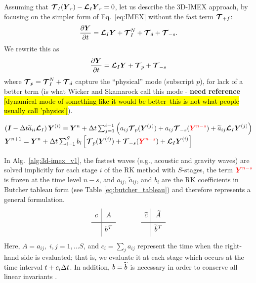 \documentclass{report}
\begin{document}
Assuming that $\boldsymbol{{\mathcal{T}}}_I(\boldsymbol{{Y}}_r) - \boldsymbol{{\mathcal{L}}}_I \boldsymbol{{Y}}_r=0$, let us
describe the 3D-IMEX approach, by focusing on the simpler form of Eq.\ \eqref{eq:IMEX} without the fast term $\boldsymbol{{\mathcal{T}}}_{+f}$: 
\begin{equation}
\label{eq:IMEX_v2}
\frac{\partial\boldsymbol{{Y}}}{\partial t} =  \boldsymbol{{\mathcal{L}}}_I \boldsymbol{{Y}} + \boldsymbol{{\mathcal{T}}}^N_{I} + \boldsymbol{{\mathcal{T}}}_{d} + \boldsymbol{{\mathcal{T}}}_{-s}.
\end{equation}
We rewrite this as
\begin{equation}
\label{eq:IMEX_v3}
\frac{\partial\boldsymbol{{Y}}}{\partial t} =  \boldsymbol{{\mathcal{L}}}_I \boldsymbol{{Y}} + \boldsymbol{{\mathcal{T}}}_{p} + \boldsymbol{{\mathcal{T}}}_{-s}
\end{equation}
where $\boldsymbol{{\mathcal{T}}}_{p}=\boldsymbol{{\mathcal{T}}}^N_{I} + \boldsymbol{{\mathcal{T}}}_{d}$ capture the ``physical'' mode (subscript $p$), for lack of a better term (is what Wicker and Skamarock call this mode - \textbf{need reference} \hl{[dynamical mode of something like it would be better--this is not what people usually call 'physics']}).
\begin{algorithm}
\label{alg:3d-imex_v1}
\begin{algorithmic}
\State
{}
\State $\left( \boldsymbol{{I}} - \Delta t \widetilde{a}_{ii} \boldsymbol{{\mathcal{L}}}_I \right) \boldsymbol{{Y}}^{(i)}=\boldsymbol{{Y}}^{n} + \Delta t \sum_{j=1}^{i-1} \left( a_{ij} \boldsymbol{{\mathcal{T}}}_{p}(\boldsymbol{{Y}}^{(j)}) + a_{ij} \boldsymbol{{\mathcal{T}}}_{-s}(\textcolor{red}{\boldsymbol{{Y}}^{n-s}})
+ \widetilde{a}_{ij} \boldsymbol{{\mathcal{L}}}_I \boldsymbol{{Y}}^{(j)} \right)$ 
\EndFor %
\State $\boldsymbol{{Y}}^{n+1}=\boldsymbol{{Y}}^{n} + \Delta t \sum_{i=1}^{S} b_{i} \left[ \boldsymbol{{\mathcal{T}}}_{p}(\boldsymbol{{Y}}^{(i)}) + \boldsymbol{{\mathcal{T}}}_{-s}(\textcolor{red}{\boldsymbol{{Y}}^{n-s}})
+ \boldsymbol{{\mathcal{L}}}_I \boldsymbol{{Y}}^{(i)} \right]$
\EndFunction
\end{algorithmic}
\end{algorithm}
In Alg.\ \ref{alg:3d-imex_v1}, the fastest waves (e.g., acoustic and gravity waves) are solved implicitly for each stage $i$ of the RK method with $S$-stages, the term $\textcolor{red}{\boldsymbol{{Y}}^{n-s}}$ is frozen at the time level $n-s$, and $a_{ij}$, $\widetilde{a}_{ij}$, and $b_i$ are the RK coefficients in Butcher tableau form (see Table \ref{eq:butcher_tableau}) and therefore represents a general formulation.
\begin{equation}
\begin{array}{c|c}
\ST c&A\\
\hline
\ST  & b\transpose
\end{array}
\hspace{0.5in}
\begin{array}{c|c}
\ST \wt{c} & \wt{A} \\
\hline
\ST  & \wt{b} \transpose
\end{array}
\label{eq:butcher_tableau}
\end{equation}
Here, $A=a_{ij}, \; i,j=1,\ldots S$, and $c_i=\sum_{j} a_{ij}$ represent the time when the right-hand side is evaluated; that is, we evaluate it at each stage which occurs at the time interval $t+c_i {\Delta t}$.
In addition, $b=\widetilde{b}$ is necessary in order to conserve all linear invariants \cite{giraldo:2013}.
\end{document}
